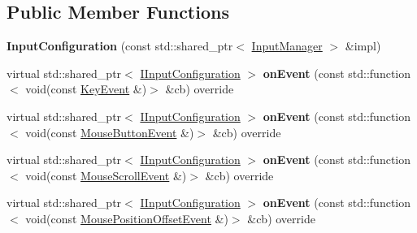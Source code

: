 \subsection*{Public Member Functions}
\begin{DoxyCompactItemize}
\item 
{\bfseries Input\+Configuration} (const std\+::shared\+\_\+ptr$<$ \hyperlink{class_s_l_1_1_input___lite_1_1_input_manager}{Input\+Manager} $>$ \&impl)\hypertarget{class_s_l_1_1_input___lite_1_1_input_configuration_a3f00024fca3995c3510b086865e95915}{}\label{class_s_l_1_1_input___lite_1_1_input_configuration_a3f00024fca3995c3510b086865e95915}

\item 
virtual std\+::shared\+\_\+ptr$<$ \hyperlink{class_s_l_1_1_input___lite_1_1_i_input_configuration}{I\+Input\+Configuration} $>$ {\bfseries on\+Event} (const std\+::function$<$ void(const \hyperlink{struct_s_l_1_1_input___lite_1_1_key_event}{Key\+Event} \&)$>$ \&cb) override\hypertarget{class_s_l_1_1_input___lite_1_1_input_configuration_afa950df3f4914e3eb185f0197f873860}{}\label{class_s_l_1_1_input___lite_1_1_input_configuration_afa950df3f4914e3eb185f0197f873860}

\item 
virtual std\+::shared\+\_\+ptr$<$ \hyperlink{class_s_l_1_1_input___lite_1_1_i_input_configuration}{I\+Input\+Configuration} $>$ {\bfseries on\+Event} (const std\+::function$<$ void(const \hyperlink{struct_s_l_1_1_input___lite_1_1_mouse_button_event}{Mouse\+Button\+Event} \&)$>$ \&cb) override\hypertarget{class_s_l_1_1_input___lite_1_1_input_configuration_a19a9bcdd919c4214c72c20b8170eede3}{}\label{class_s_l_1_1_input___lite_1_1_input_configuration_a19a9bcdd919c4214c72c20b8170eede3}

\item 
virtual std\+::shared\+\_\+ptr$<$ \hyperlink{class_s_l_1_1_input___lite_1_1_i_input_configuration}{I\+Input\+Configuration} $>$ {\bfseries on\+Event} (const std\+::function$<$ void(const \hyperlink{struct_s_l_1_1_input___lite_1_1_mouse_scroll_event}{Mouse\+Scroll\+Event} \&)$>$ \&cb) override\hypertarget{class_s_l_1_1_input___lite_1_1_input_configuration_a0572186af8f1559aa401544e5a48d610}{}\label{class_s_l_1_1_input___lite_1_1_input_configuration_a0572186af8f1559aa401544e5a48d610}

\item 
virtual std\+::shared\+\_\+ptr$<$ \hyperlink{class_s_l_1_1_input___lite_1_1_i_input_configuration}{I\+Input\+Configuration} $>$ {\bfseries on\+Event} (const std\+::function$<$ void(const \hyperlink{struct_s_l_1_1_input___lite_1_1_mouse_position_offset_event}{Mouse\+Position\+Offset\+Event} \&)$>$ \&cb) override\hypertarget{class_s_l_1_1_input___lite_1_1_input_configuration_a9579d18af532739c4650aee4b3ab6cb7}{}\label{class_s_l_1_1_input___lite_1_1_input_configuration_a9579d18af532739c4650aee4b3ab6cb7}


\end{DoxyCompactItemize}
